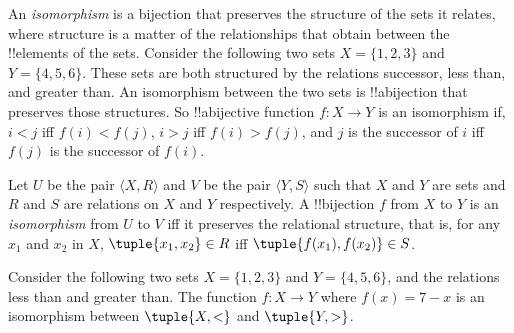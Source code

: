 \documentclass[../../../include/open-logic-section]{subfiles}
\begin{document}

\begin{explain}
An \emph{isomorphism} is a bijection that preserves the structure of
the sets it relates, where structure is a matter of the relationships
that obtain between the !!{element}s of the sets. Consider the
following two sets $X=\{1,2,3\}$ and $Y=\{4,5,6\}$. These sets are
both structured by the relations successor, less than, and greater
than. An isomorphism between the two sets is !!a{bijection} that
preserves those structures. So !!a{bijective} function $f \colon X
\to Y$ is an isomorphism if, $i<j$ iff $f(i)<f(j)$, $i>j$ iff
$f(i)>f(j)$, and $j$ is the successor of $i$ iff $f(j)$ is the
successor of $f(i)$.
\end{explain}

\begin{defn}[Isomorphism]
Let $U$ be the pair $\langle X, R\rangle$ and $V$ be the pair $\langle
Y, S\rangle$ such that $X$ and $Y$ are sets and $R$ and $S$ are
relations on $X$ and $Y$ respectively. A !!{bijection} $f$ from $X$ to
$Y$ is an \emph{isomorphism} from $U$ to $V$ iff it preserves the
relational structure, that is, for any $x_{1}$ and $x_{2}$ in $X$,
$\tuple{x_1,x_2} \in R$ iff $\tuple{f(x_1),f(x_2)} \in S$.
\end{defn}

\begin{ex}
Consider the following two sets $X=\{1,2,3\}$ and $Y=\{4,5,6\}$, and
the relations less than and greater than. The function $f\colon X \to
Y$ where $f(x) = 7-x$ is an isomorphism between $\tuple{X,<}$ and
$\tuple{Y,>}$.
\end{ex}
\end{document}
